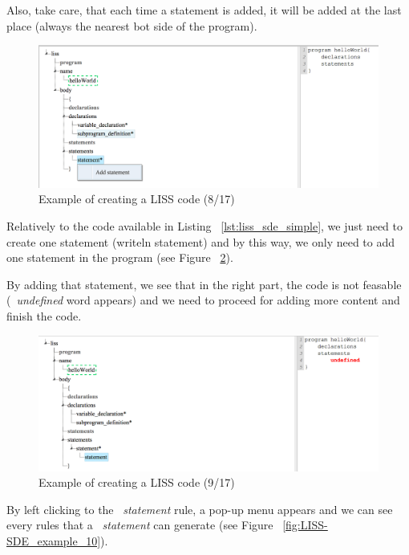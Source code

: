 \documentclass[
  oneside,
  11pt, a4paper,
  footinclude=true,
  headinclude=true,
  cleardoublepage=empty
]{scrbook}
\begin{document}
Also, take care, that each time a statement is added, it will be added at the last place (always the nearest bot side of the program).

\begin{figure}[h!]
  \centering
    \includegraphics[width=1\textwidth]{img/LISS-SDE_creating_program/LISS-SDE8.png}
    \caption{Example of creating a LISS code (8/17)}
    \label{fig:LISS-SDE_example_8}
\end{figure}

Relatively to the code available in Listing ~\ref{lst:liss_sde_simple}, we just need to create one statement (writeln statement) and by this way, we only need to add one statement in the program (see Figure ~\ref{fig:LISS-SDE_example_9}).

By adding that statement, we see that in the right part, the code is not feasable (~\textit{undefined} word appears) and we need to proceed for adding more content and finish the code.

\begin{figure}[h!]
  \centering
    \includegraphics[width=1\textwidth]{img/LISS-SDE_creating_program/LISS-SDE9.png}
    \caption{Example of creating a LISS code (9/17)}
    \label{fig:LISS-SDE_example_9}
\end{figure}

By left clicking to the ~\textit{statement} rule, a pop-up menu appears and we can see every rules that a ~\textit{statement} can generate (see Figure ~\ref{fig:LISS-SDE_example_10}).
\end{document}
